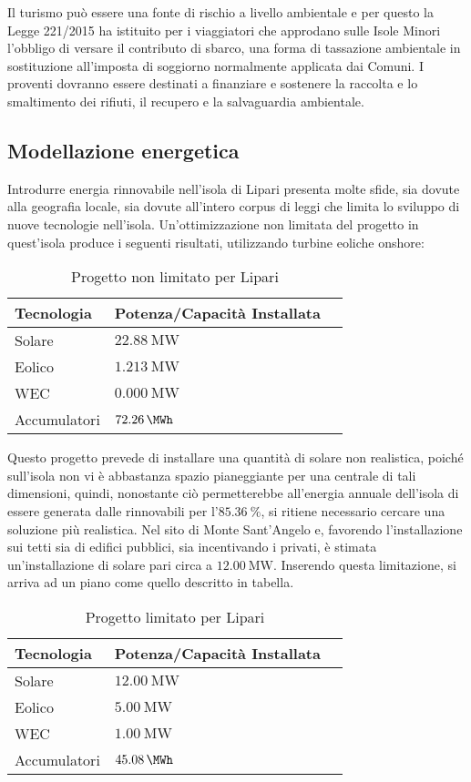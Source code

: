 \documentclass[fleqn,11pt]{SelfArx} %
\begin{document}
Il turismo può essere una fonte di rischio a livello ambientale e per questo la Legge 221/2015 ha istituito per i viaggiatori che approdano sulle Isole Minori l'obbligo di versare il contributo di sbarco, una forma di tassazione ambientale in sostituzione all'imposta di soggiorno normalmente applicata dai Comuni. I proventi dovranno essere destinati a finanziare e sostenere la raccolta e lo smaltimento dei rifiuti, il recupero e la salvaguardia ambientale. 


\subsection{Modellazione energetica}
Introdurre energia rinnovabile nell'isola di Lipari presenta molte sfide, sia dovute alla geografia locale, sia dovute all'intero corpus di leggi che limita lo sviluppo di nuove tecnologie nell'isola.
Un'ottimizzazione non limitata del progetto in quest'isola produce i seguenti risultati, utilizzando turbine eoliche onshore:
\begin{table}[H]
	\caption{Progetto non limitato per Lipari}
	\centering
	\begin{tabular}{llc}
		\toprule
		Tecnologia   & Potenza/Capacità Installata \\
		\midrule
		Solare       & \(\SI{22.88}{\MW}\)         \\
		Eolico       & \(\SI{1.213}{\MW}\)          \\
		WEC          & \(\SI{0.000}{\MW}\)         \\
		Accumulatori & \(\SI{72.26}{\MWh}\)        \\
		\bottomrule
	\end{tabular}
	\label{tab:lipari_unbounded_1}
\end{table}

Questo progetto prevede di installare una quantità di solare non realistica, poiché sull'isola non vi è abbastanza spazio pianeggiante per una centrale di tali dimensioni, quindi, nonostante ciò permetterebbe all'energia annuale dell'isola di essere generata dalle rinnovabili per l'\(\SI{85.36}{\percent}\), si ritiene necessario cercare una soluzione più realistica.
Nel sito di Monte Sant'Angelo e, favorendo l'installazione sui tetti sia di edifici pubblici, sia incentivando i privati, è stimata un'installazione di solare pari circa a \(\SI{12.00}{\MW}\). Inserendo questa limitazione, si arriva ad un piano come quello descritto in tabella.

\begin{table}[H]
	\caption{Progetto limitato per Lipari}
	\centering
	\begin{tabular}{llc}
		\toprule
		Tecnologia   & Potenza/Capacità Installata \\
		\midrule
		Solare       & \(\SI{12.00}{\MW}\)         \\
		Eolico       & \(\SI{5.00}{\MW}\)          \\
		WEC          & \(\SI{1.00}{\MW}\)         \\
		Accumulatori & \(\SI{45.08}{\MWh}\)        \\
		\bottomrule
	\end{tabular}
	\label{tab:lipari_bounded}
\end{table}
\end{document}
